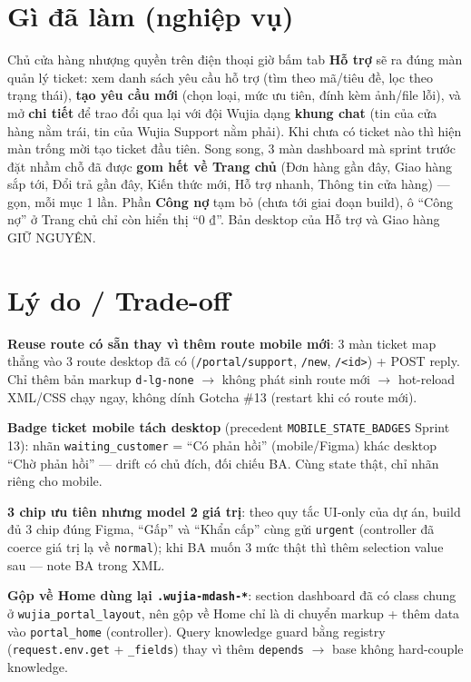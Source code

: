 \section{Gì đã làm (nghiệp vụ)}

Chủ cửa hàng nhượng quyền trên điện thoại giờ bấm tab \textbf{Hỗ trợ} sẽ ra đúng màn
quản lý ticket: xem danh sách yêu cầu hỗ trợ (tìm theo mã/tiêu đề, lọc theo trạng thái),
\textbf{tạo yêu cầu mới} (chọn loại, mức ưu tiên, đính kèm ảnh/file lỗi), và mở
\textbf{chi tiết} để trao đổi qua lại với đội Wujia dạng \textbf{khung chat} (tin của
cửa hàng nằm trái, tin của Wujia Support nằm phải). Khi chưa có ticket nào thì hiện màn
trống mời tạo ticket đầu tiên. Song song, 3 màn dashboard mà sprint trước đặt nhầm chỗ
đã được \textbf{gom hết về Trang chủ} (Đơn hàng gần đây, Giao hàng sắp tới, Đổi trả gần
đây, Kiến thức mới, Hỗ trợ nhanh, Thông tin cửa hàng) --- gọn, mỗi mục 1 lần. Phần
\textbf{Công nợ} tạm bỏ (chưa tới giai đoạn build), ô ``Công nợ'' ở Trang chủ chỉ còn
hiển thị ``0 ₫''. Bản desktop của Hỗ trợ và Giao hàng GIỮ NGUYÊN.

\section{Lý do / Trade-off}

\textbf{Reuse route có sẵn thay vì thêm route mobile mới}: 3 màn ticket map thẳng vào
3 route desktop đã có (\texttt{/portal/support}, \texttt{/new}, \texttt{/<id>}) + POST
reply. Chỉ thêm bản markup \texttt{d-lg-none} \(\rightarrow\) không phát sinh route mới
\(\rightarrow\) hot-reload XML/CSS chạy ngay, không dính Gotcha \#13 (restart khi có route
mới).

\textbf{Badge ticket mobile tách desktop} (precedent \texttt{MOBILE\_STATE\_BADGES} Sprint
13): nhãn \texttt{waiting\_customer} = ``Có phản hồi'' (mobile/Figma) khác desktop ``Chờ
phản hồi'' --- drift có chủ đích, đối chiếu BA. Cùng state thật, chỉ nhãn riêng cho mobile.

\textbf{3 chip ưu tiên nhưng model 2 giá trị}: theo quy tắc UI-only của dự án, build đủ
3 chip đúng Figma, ``Gấp'' và ``Khẩn cấp'' cùng gửi \texttt{urgent} (controller đã coerce
giá trị lạ về \texttt{normal}); khi BA muốn 3 mức thật thì thêm selection value sau ---
note BA trong XML.

\textbf{Gộp về Home dùng lại \texttt{.wujia-mdash-*}}: section dashboard đã có class chung
ở \texttt{wujia\_portal\_layout}, nên gộp về Home chỉ là di chuyển markup + thêm data
vào \texttt{portal\_home} (controller). Query knowledge guard bằng registry
(\texttt{request.env.get} + \texttt{\_fields}) thay vì thêm \texttt{depends} \(\rightarrow\)
base không hard-couple knowledge.

